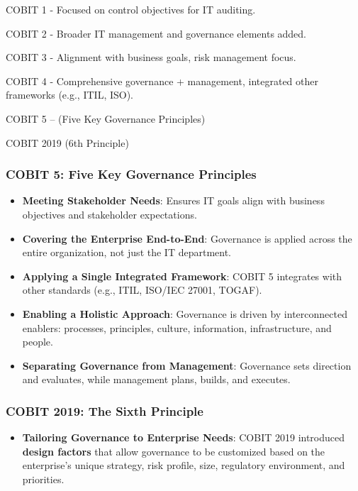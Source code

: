 \indent 

\step COBIT 1 - Focused on control objectives for IT auditing.

\step COBIT 2 - Broader IT management and governance elements added.

\step COBIT 3 - Alignment with business goals, risk management focus.

\step COBIT 4 - Comprehensive governance + management, integrated other frameworks (e.g., ITIL, ISO).

\step COBIT 5 – (Five Key Governance Principles)

\step COBIT 2019 (6th Principle)

\subsubsection{COBIT 5: Five Key Governance Principles}

\begin{itemize}
    \item \textbf{Meeting Stakeholder Needs}: Ensures IT goals align with business objectives and stakeholder expectations.
    \item \textbf{Covering the Enterprise End-to-End}: Governance is applied across the entire organization, not just the IT department.
    \item \textbf{Applying a Single Integrated Framework}: COBIT 5 integrates with other standards (e.g., ITIL, ISO/IEC 27001, TOGAF).
    \item \textbf{Enabling a Holistic Approach}: Governance is driven by interconnected enablers: processes, principles, culture, information, infrastructure, and people.
    \item \textbf{Separating Governance from Management}: Governance sets direction and evaluates, while management plans, builds, and executes.
\end{itemize}

\subsubsection{COBIT 2019: The Sixth Principle}

\begin{itemize}
    \item \textbf{Tailoring Governance to Enterprise Needs}: COBIT 2019 introduced \textbf{design factors} that allow governance to be customized based on the enterprise’s unique strategy, risk profile, size, regulatory environment, and priorities.
\end{itemize}

